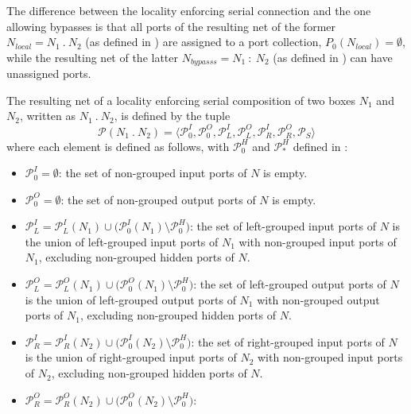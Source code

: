 The difference between the locality enforcing serial connection and the one allowing bypasses is that all ports of the resulting net of the former $N_{local} = N_1\ .\ N_2$ (as defined in \Def{\ref{def_smx_sl}}) are assigned to a port collection, \ie $P_0(N_{local}) = \emptyset$, while the resulting net of the latter $N_{bypasss} = N_1\ :\ N_2$ (as defined in \Def{\ref{def_smx_so}}) can have unassigned ports.

\begin{definition}
    \label{def_smx_sl}
    The resulting net of a locality enforcing serial composition of two boxes $N_1$ and $N_2$, written as $N_1 \ . \ N_2$, is defined by the tuple
    $$\mathcal{P}(N_1\ .\ N_2) = \langle \mathcal{P}_0^I, \mathcal{P}_0^O, \mathcal{P}_L^I, \mathcal{P}_L^O, \mathcal{P}_R^I, \mathcal{P}_R^O, \mathcal{P}_S \rangle$$
    where each element is defined as follows, with $\mathcal{P}_0^H$ and $\mathcal{P}_*^H$ defined in \Def{\ref{def_smx_sc}}:
    \begin{itemize}
        \item $\mathcal{P}_0^I = \emptyset$:
            the set of non-grouped input ports of $N$ is empty.
        \item $\mathcal{P}_0^O = \emptyset$:
            the set of non-grouped output ports of $N$ is empty.
        \item $\mathcal{P}_L^I = \mathcal{P}_L^I(N_1) \cup \big ( \mathcal{P}_0^I(N_1) \setminus \mathcal{P}_0^H \big )$:
            the set of left-grouped input ports of $N$ is the union of left-grouped input ports of $N_1$ with non-grouped input ports of $N_1$, excluding non-grouped hidden ports of $N$.
        \item $\mathcal{P}_L^O = \mathcal{P}_L^O(N_1) \cup \big ( \mathcal{P}_0^O(N_1) \setminus \mathcal{P}_0^H \big )$:
            the set of left-grouped output ports of $N$ is the union of left-grouped output ports of $N_1$ with non-grouped output ports of $N_1$, excluding non-grouped hidden ports of $N$.
        \item $\mathcal{P}_R^I = \mathcal{P}_R^I(N_2) \cup \big ( \mathcal{P}_0^I(N_2) \setminus \mathcal{P}_0^H \big )$:
            the set of right-grouped input ports of $N$ is the union of right-grouped input ports of $N_2$ with non-grouped input ports of $N_2$, excluding non-grouped hidden ports of $N$.
        \item $\mathcal{P}_R^O = \mathcal{P}_R^O(N_2) \cup \big ( \mathcal{P}_0^O(N_2) \setminus \mathcal{P}_0^H \big )$:

\end{itemize}
\end{definition}
